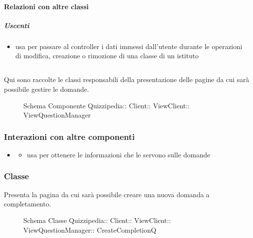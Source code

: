 \paragraph{Relazioni con altre classi}
\subparagraph{Uscenti}
\begin{itemize}
\item usa  per passare al controller i dati immessi dall'utente durante le operazioni di modifica, creazione o rimozione di una classe di un istituto
\end{itemize}
\subsection{}
Qui sono raccolte le classi responsabili della presentazione delle pagine da cui sarà possibile gestire le domande.
\begin{figure}[H]
\centering
\noindent{}
\caption[Schema Componente ViewQuestionManager]{Schema Componente Quizzipedia:: Client:: ViewClient:: ViewQuestionManager}
\end{figure}
\subsubsection{Interazioni con altre componenti}
\begin{itemize}
\item {}
\begin{itemize}
\item usa  per ottenere le informazioni che le servono sulle domande
\end{itemize}
\end{itemize}
\subsubsection{Classe }
Presenta la pagina da cui sarà possibile creare una nuova domanda a completamento.
\begin{figure}[H]
\centering
\noindent{}
\caption[Schema Classe CreateCompletionQ]{Schema Classe Quizzipedia:: Client:: ViewClient:: ViewQuestionManager:: CreateCompletionQ}
\end{figure}
